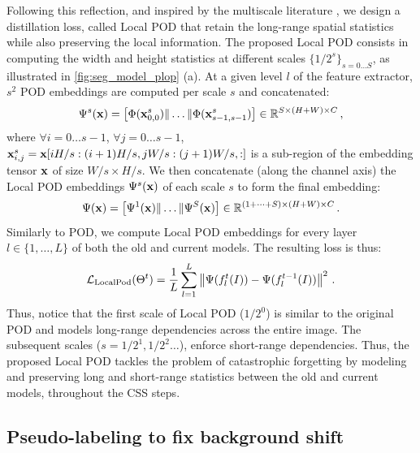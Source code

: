 Following this reflection, and inspired by the multiscale literature
\cite{lazbnik2006spatial_pyramid_matching,he2014spatialpyramidpooling}, we design a distillation
loss, called Local POD that retain the long-range spatial statistics while also preserving the local
information. The proposed Local POD consists in computing the width and height statistics at
different scales $\{1/2^s\}_{s=0 \dots S}$, as illustrated in \autoref{fig:seg_model_plop} (a). At a
given level $l$ of the feature extractor, $s^2$ POD embeddings are computed per scale $s$ and
concatenated:
%
\begin{equation}
    \Psi^s(\mathbf{x}) = \left[ \Phi(\mathbf{x}^s_{0,0}) \| \dots \| \Phi(\mathbf{x}^s_{s-1,s-1}) \right] \in \mathbb{R}^{S \times (H + W) \times C}\,,
    \label{eq:seg_localpod_embedding1}
\end{equation}
%
where $\forall i = 0 \dots s-1$, $\forall j = 0 \dots s-1$, $\mathbf{x}^s_{i,j} = \mathbf{x}[i H/s:(i+1) H/s, j
        W/s:(j+1) W/s,:]$ is a sub-region of the embedding tensor $\mathbf{x}$ of size $W/s \times H/s$. We
then concatenate (along the channel axis) the Local POD embeddings $\Psi^s(\mathbf{x})$ of each
scale $s$ to form the final embedding:
%
\begin{equation}
    \Psi(\mathbf{x}) = \left[ \Psi^1(\mathbf{x}) \| \dots \| \Psi^S(\mathbf{x}) \right] \in \mathbb{R}^{(1 + \dots + S) \times (H + W) \times C}\,.
    \label{eq:seg_local_pod}
\end{equation}
%
Similarly to POD, we compute Local POD embeddings for every layer $l \in \{1, \dots, L\}$ of both
the old and current models. The resulting loss is thus:
%
\begin{equation}
    \mathcal{L}_{\scriptstyle\text{LocalPod}}(\Theta^t) = \frac{1}{L} \sum_{l = 1}^L \left\Vert  {\Psi}(f^t_l(I)) -  {\Psi}(f^{t-1}_l(I)) \right\Vert^2\,.
    \label{eq:seg_local_pod_loss}
\end{equation}
%
Thus, notice that the first scale of Local POD ($1/2^0$) is similar to the original POD and models
long-range dependencies across the entire image. The subsequent scales ($s=1/2^1, 1/2^2 \dots$),
enforce short-range dependencies. Thus, the proposed Local POD tackles the problem of catastrophic
forgetting by modeling and preserving long and short-range statistics between the old and current
models, throughout the \ac{CSS} steps.


\subsection{Pseudo-labeling to fix background shift}\label{sec:seg_hardpl}

